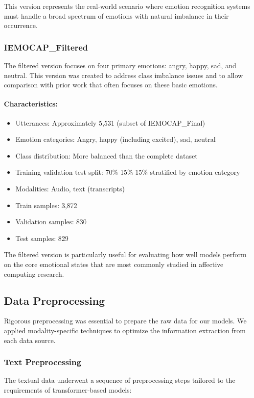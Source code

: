 \documentclass[12pt]{article}
\begin{document}
This version represents the real-world scenario where emotion recognition systems must handle a broad spectrum of emotions with natural imbalance in their occurrence.

\subsubsection{IEMOCAP\_Filtered}
The filtered version focuses on four primary emotions: angry, happy, sad, and neutral. This version was created to address class imbalance issues and to allow comparison with prior work that often focuses on these basic emotions.

\paragraph{Characteristics:}
\begin{itemize}
    \item Utterances: Approximately 5,531 (subset of IEMOCAP\_Final)
    \item Emotion categories: Angry, happy (including excited), sad, neutral
    \item Class distribution: More balanced than the complete dataset
    \item Training-validation-test split: 70\%-15\%-15\% stratified by emotion category
    \item Modalities: Audio, text (transcripts)
    \item Train samples: 3,872
    \item Validation samples: 830
    \item Test samples: 829
\end{itemize}

The filtered version is particularly useful for evaluating how well models perform on the core emotional states that are most commonly studied in affective computing research.

\subsection{Data Preprocessing}
Rigorous preprocessing was essential to prepare the raw data for our models. We applied modality-specific techniques to optimize the information extraction from each data source.

\subsubsection{Text Preprocessing}
The textual data underwent a sequence of preprocessing steps tailored to the requirements of transformer-based models:
\end{document}
